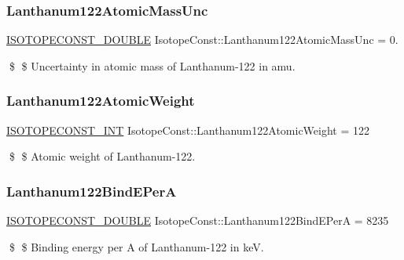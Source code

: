 \subsubsection{\texorpdfstring{Lanthanum122\+Atomic\+Mass\+Unc}{Lanthanum122AtomicMassUnc}}
{\footnotesize\ttfamily \mbox{\hyperlink{group___isotope_const-_macros_ga8f45a7272ce02c0b4c65c44636ed719a}{I\+S\+O\+T\+O\+P\+E\+C\+O\+N\+S\+T\+\_\+\+D\+O\+U\+B\+LE}} Isotope\+Const\+::\+Lanthanum122\+Atomic\+Mass\+Unc = 0.}

\$ \$ Uncertainty in atomic mass of Lanthanum-\/122 in amu. \mbox{\label{group___isotope_const-_lanthanum-_la122_gacb9bd9ce23f3a381da254f88677acc59}} 
\subsubsection{\texorpdfstring{Lanthanum122\+Atomic\+Weight}{Lanthanum122AtomicWeight}}
{\footnotesize\ttfamily \mbox{\hyperlink{group___isotope_const-_macros_ga5f18360b3e99483a35c32d789e62621c}{I\+S\+O\+T\+O\+P\+E\+C\+O\+N\+S\+T\+\_\+\+I\+NT}} Isotope\+Const\+::\+Lanthanum122\+Atomic\+Weight = 122}

\$ \$ Atomic weight of Lanthanum-\/122. \mbox{\label{group___isotope_const-_lanthanum-_la122_ga62336cd9c27852e9594bef63a1d60e3b}} 
\subsubsection{\texorpdfstring{Lanthanum122\+Bind\+E\+PerA}{Lanthanum122BindEPerA}}
{\footnotesize\ttfamily \mbox{\hyperlink{group___isotope_const-_macros_ga8f45a7272ce02c0b4c65c44636ed719a}{I\+S\+O\+T\+O\+P\+E\+C\+O\+N\+S\+T\+\_\+\+D\+O\+U\+B\+LE}} Isotope\+Const\+::\+Lanthanum122\+Bind\+E\+PerA = 8235}

\$ \$ Binding energy per A of Lanthanum-\/122 in keV. \mbox{\label{group___isotope_const-_lanthanum-_la122_ga052e8fd7864ecb79ef3f0ad55977fc5a}} 

